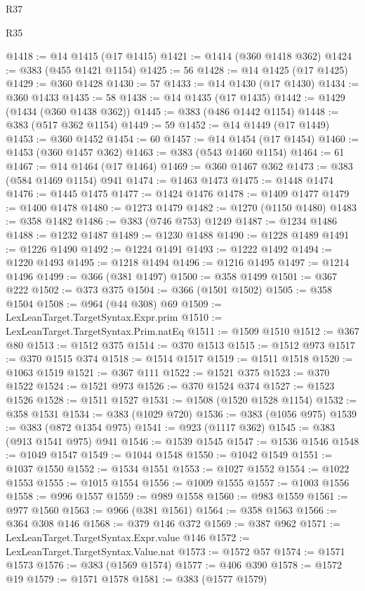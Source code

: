 \begin{lexlean}{R37}
\begin{lexlean}{R35}
\begin{coremodule}
{{{{{{{{{{{{{{{{{{{{{{{{{{{{{{{{{{{{{{{{{{{{{{{{{{{{@1418 := @14 @1415 (@17 @1415)
@1421 := @1414 (@360 @1418 @362)
@1424 := @383 (@455 @1421 @1154)
@1425 := 56
@1428 := @14 @1425 (@17 @1425)
@1429 := @360 @1428
@1430 := 57
@1433 := @14 @1430 (@17 @1430)
@1434 := @360 @1433
@1435 := 58
@1438 := @14 @1435 (@17 @1435)
@1442 := @1429 (@1434 (@360 @1438 @362))
@1445 := @383 (@486 @1442 @1154)
@1448 := @383 (@517 @362 @1154)
@1449 := 59
@1452 := @14 @1449 (@17 @1449)
@1453 := @360 @1452
@1454 := 60
@1457 := @14 @1454 (@17 @1454)
@1460 := @1453 (@360 @1457 @362)
@1463 := @383 (@543 @1460 @1154)
@1464 := 61
@1467 := @14 @1464 (@17 @1464)
@1469 := @360 @1467 @362
@1473 := @383 (@584 @1469 @1154) @941
@1474 := @1463 @1473
@1475 := @1448 @1474
@1476 := @1445 @1475
@1477 := @1424 @1476
@1478 := @1409 @1477
@1479 := @1400 @1478
@1480 := @1273 @1479
@1482 := @1270 (@1150 @1480)
@1483 := @358 @1482
@1486 := @383 (@746 @753) @1249
@1487 := @1234 @1486
@1488 := @1232 @1487
@1489 := @1230 @1488
@1490 := @1228 @1489
@1491 := @1226 @1490
@1492 := @1224 @1491
@1493 := @1222 @1492
@1494 := @1220 @1493
@1495 := @1218 @1494
@1496 := @1216 @1495
@1497 := @1214 @1496
@1499 := @366 (@381 @1497)
@1500 := @358 @1499
@1501 := @367 @222
@1502 := @373 @375
@1504 := @366 (@1501 @1502)
@1505 := @358 @1504
@1508 := @964 (@44 @308) @69
@1509 := LexLeanTarget.TargetSyntax.Expr.prim
@1510 := LexLeanTarget.TargetSyntax.Prim.natEq
@1511 := @1509 @1510
@1512 := @367 @80
@1513 := @1512 @375
@1514 := @370 @1513
@1515 := @1512 @973
@1517 := @370 @1515 @374
@1518 := @1514 @1517
@1519 := @1511 @1518
@1520 := @1063 @1519
@1521 := @367 @111
@1522 := @1521 @375
@1523 := @370 @1522
@1524 := @1521 @973
@1526 := @370 @1524 @374
@1527 := @1523 @1526
@1528 := @1511 @1527
@1531 := @1508 (@1520 @1528 @1154)
@1532 := @358 @1531
@1534 := @383 (@1029 @720)
@1536 := @383 (@1056 @975)
@1539 := @383 (@872 @1354 @975)
@1541 := @923 (@1117 @362)
@1545 := @383 (@913 @1541 @975) @941
@1546 := @1539 @1545
@1547 := @1536 @1546
@1548 := @1049 @1547
@1549 := @1044 @1548
@1550 := @1042 @1549
@1551 := @1037 @1550
@1552 := @1534 @1551
@1553 := @1027 @1552
@1554 := @1022 @1553
@1555 := @1015 @1554
@1556 := @1009 @1555
@1557 := @1003 @1556
@1558 := @996 @1557
@1559 := @989 @1558
@1560 := @983 @1559
@1561 := @977 @1560
@1563 := @966 (@381 @1561)
@1564 := @358 @1563
@1566 := @364 @308 @146
@1568 := @379 @146 @372
@1569 := @387 @962
@1571 := LexLeanTarget.TargetSyntax.Expr.value @146
@1572 := LexLeanTarget.TargetSyntax.Value.nat
@1573 := @1572 @57
@1574 := @1571 @1573
@1576 := @383 (@1569 @1574)
@1577 := @406 @390
@1578 := @1572 @19
@1579 := @1571 @1578
@1581 := @383 (@1577 @1579)
}}}}}}}}}}}}}}}}}}}}}}}}}}}}}}}}}}}}}}}}}}}}}}}}}}}}
\end{coremodule}
\end{lexlean}
\end{lexlean}
